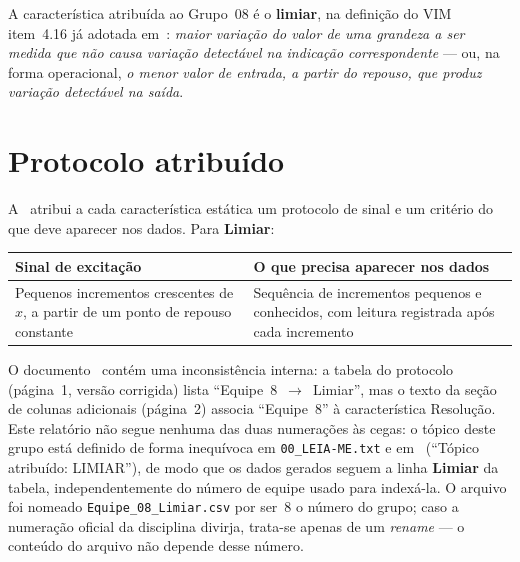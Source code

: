 A característica atribuída ao Grupo~08 é o \textbf{limiar}, na definição do VIM~\cite{vim2012}
item~4.16 já adotada em~\cite{limiarv1}: \emph{maior variação do valor de uma grandeza a ser
medida que não causa variação detectável na indicação correspondente} --- ou, na forma
operacional, \emph{o menor valor de entrada, a partir do repouso, que produz variação detectável
na saída}.

\section{Protocolo atribuído}
\label{sec:protocolo}

A~\cite{orientacao2026} atribui a cada característica estática um protocolo de sinal e um
critério do que deve aparecer nos dados. Para \textbf{Limiar}:

\begin{center}\small
\begin{tabular}{@{}>{\raggedright\arraybackslash}p{6.6cm}>{\raggedright\arraybackslash}p{7.4cm}@{}}
\toprule
\textbf{Sinal de excitação} & \textbf{O que precisa aparecer nos dados}\\
\midrule
Pequenos incrementos crescentes de $x$, a partir de um ponto de repouso constante
& Sequência de incrementos pequenos e conhecidos, com leitura registrada após cada incremento\\
\bottomrule
\end{tabular}
\end{center}

\begin{caixa}[title={Nota sobre a numeração ``Equipe X'' na orientação recebida}]
O documento~\cite{orientacao2026} contém uma inconsistência interna: a tabela do protocolo
(página~1, versão corrigida) lista ``Equipe~8~$\to$~Limiar'', mas o texto da seção de colunas
adicionais (página~2) associa ``Equipe~8'' à característica Resolução. Este relatório não segue
nenhuma das duas numerações às cegas: o tópico deste grupo está definido de forma inequívoca em
\texttt{00\_LEIA-ME.txt} e em~\cite{limiarv1} (``Tópico atribuído: LIMIAR''), de modo que os
dados gerados seguem a linha \textbf{Limiar} da tabela, independentemente do número de equipe
usado para indexá-la. O arquivo foi nomeado \texttt{Equipe\_08\_Limiar.csv} por ser~8 o número do
grupo; caso a numeração oficial da disciplina divirja, trata-se apenas de um \emph{rename} --- o
conteúdo do arquivo não depende desse número.
\end{caixa}

